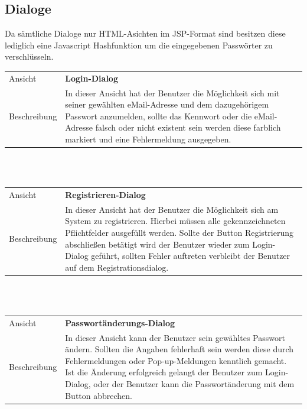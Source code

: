 \documentclass[12pt]{scrreprt}
\begin{document}
\subsection{Dialoge}

Da sämtliche Dialoge nur HTML-Asichten im JSP-Format sind besitzen diese lediglich eine Javascript Hashfunktion um die eingegebenen Passwörter zu verschlüsseln. \\

\begin{tabular}{|lp{12cm}|}
	\hline
	Ansicht &  \textbf{Login-Dialog}\\ 
	Beschreibung & In dieser Ansicht hat der Benutzer die Möglichkeit sich mit seiner gewählten eMail-Adresse und dem dazugehörigem Passwort anzumelden, sollte das Kennwort oder die eMail-Adresse falsch oder nicht existent sein werden diese farblich markiert und eine Fehlermeldung ausgegeben.\\ 
	\hline 
\end{tabular} \\\\

\begin{tabular}{|lp{12cm}|}
	\hline
	Ansicht &  \textbf{Registrieren-Dialog}\\
	Beschreibung & In dieser Ansicht hat  der Benutzer die Möglichkeit sich am System zu registrieren. Hierbei müssen alle gekennzeichneten Pflichtfelder ausgefüllt werden. Sollte der Button  Registrierung abschließen betätigt wird der Benutzer wieder zum Login-Dialog geführt, sollten Fehler auftreten verbleibt der Benutzer auf dem Registrationsdialog.\\ 
	\hline 
\end{tabular} \\\\

\begin{tabular}{|lp{12cm}|}
	\hline
	Ansicht &  \textbf{Passwortänderungs-Dialog}\\ 
	Beschreibung & In dieser Ansicht kann der Benutzer sein gewähltes Passwort ändern. Sollten die Angaben fehlerhaft sein werden diese durch Fehlermeldungen oder Pop-up-Meldungen kenntlich gemacht. Ist die Änderung erfolgreich gelangt der Benutzer zum Login-Dialog, oder der Benutzer kann die Passwortänderung mit dem Button abbrechen.\\ 
	\hline 
\end{tabular} \\\\
\end{document}
